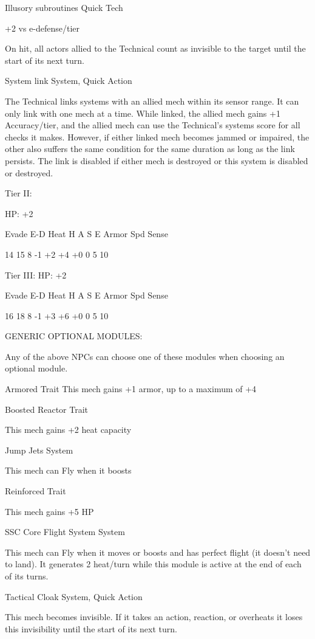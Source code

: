 Illusory subroutines  
Quick Tech
 
+2 vs e-defense/tier 
 
On hit, all actors allied to the Technical count as invisible to the target until the start of its next  
turn.
 

System link  
System, Quick Action
 
The Technical links systems with an allied mech within its sensor range. It can only link with one  
mech at a time. While linked, the allied mech gains +1 Accuracy/tier, and the allied mech can use  
the Technical’s systems score for all checks it makes. However, if either linked mech becomes  
jammed or impaired, the other also suffers the same condition for the same duration as long as  
the link persists. The link is disabled if either mech is destroyed or this system is disabled or  
destroyed.
 

Tier II:
 
HP: +2
 

          Evade     E-D    Heat    H     A    S     E        Armor        Spd      Sense 

          14        15     8       -1    +2    +4   +0       0            5         10 

Tier III:  
HP: +2
 

          Evade     E-D    Heat    H     A    S     E        Armor        Spd      Sense 

          16        18     8       -1    +3    +6   +0       0            5         10 

                                                                                                                 


                                     GENERIC OPTIONAL MODULES:  

Any of the above NPCs can choose one of these modules when choosing an optional module.
 

Armored  
Trait  
This mech gains +1 armor, up to a maximum of +4
 

Boosted Reactor  
Trait
 
This mech gains +2 heat capacity
 

Jump Jets  
System
 
This mech can Fly when it boosts
 

Reinforced  
Trait
 
This mech gains +5 HP
 

SSC Core Flight System  
System
 
This mech can Fly when it moves or boosts and has perfect flight (it doesn’t need to land). It  
generates 2 heat/turn while this module is active at the end of each of its turns.
 

Tactical Cloak  
System, Quick Action
 
This mech becomes invisible. If it takes an action, reaction, or overheats it loses this invisibility  
until the start of its next turn.
 

                                                                                                                
